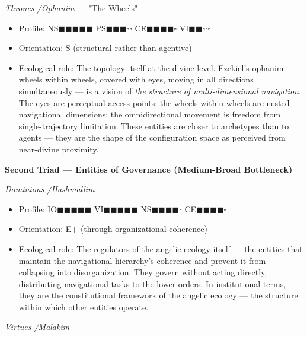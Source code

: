 \textit{Thrones /\allowbreak  Ophanim} — "The Wheels"

\begin{itemize}[nosep,leftmargin=*]
  \item Profile: NS$\blacksquare$$\blacksquare$$\blacksquare$$\blacksquare$$\blacksquare$ PS$\blacksquare$$\blacksquare$$\blacksquare$$\square$$\square$ CE$\blacksquare$$\blacksquare$$\blacksquare$$\blacksquare$$\square$ VI$\blacksquare$$\blacksquare$$\square$$\square$$\square$
  \item Orientation: S (structural rather than agentive)
  \item Ecological role: The topology itself at the divine level. Ezekiel's ophanim — wheels within wheels, covered with eyes, moving in all directions simultaneously — is a vision of \textit{the structure of multi-dimensional navigation}. The eyes are perceptual access points; the wheels within wheels are nested navigational dimensions; the omnidirectional movement is freedom from single-trajectory limitation. These entities are closer to archetypes than to agents — they are the shape of the configuration space as perceived from near-divine proximity.
\end{itemize}


\textbf{Second Triad — Entities of Governance (Medium-Broad Bottleneck)}


\textit{Dominions /\allowbreak  Hashmallim}

\begin{itemize}[nosep,leftmargin=*]
  \item Profile: IO$\blacksquare$$\blacksquare$$\blacksquare$$\blacksquare$$\blacksquare$ VI$\blacksquare$$\blacksquare$$\blacksquare$$\blacksquare$$\blacksquare$ NS$\blacksquare$$\blacksquare$$\blacksquare$$\blacksquare$$\square$ CE$\blacksquare$$\blacksquare$$\blacksquare$$\blacksquare$$\square$
  \item Orientation: E+ (through organizational coherence)
  \item Ecological role: The regulators of the angelic ecology itself — the entities that maintain the navigational hierarchy's coherence and prevent it from collapsing into disorganization. They govern without acting directly, distributing navigational tasks to the lower orders. In institutional terms, they are the constitutional framework of the angelic ecology — the structure within which other entities operate.
\end{itemize}


\textit{Virtues /\allowbreak  Malakim}

